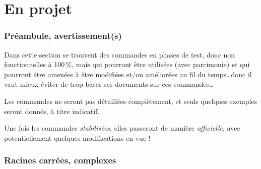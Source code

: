 \part{En projet}

\section{Préambule, avertissement(s)}\label{projets}

\begin{tipblock}
Dans cette section se trouvent des commandes en phases de test, donc non fonctionnelles à 100\,\%, mais qui pourront être utilisées (avec parcimonie) et qui pourront être amenées à être modifiées et/ou améliorées au fil du temps\ldots donc il vaut mieux éviter de trop baser ses documents sur ces commandes\ldots
\end{tipblock}

\begin{cautionblock}
Les commandes ne seront pas détaillées complètement, et seuls quelques exemples seront donnés, à titre indicatif.

\smallskip

Une fois les commandes \textit{stabilisées}, elles passeront de manière \textit{officielle}, avec potentiellement quelques modifications en vue !
\end{cautionblock}

\section{Racines carrées, complexes}

\begin{PresCodeLaTeX}{}
\end{PresCodeLaTeX}

\begin{PresCodeLaTeX}{}
\end{PresCodeLaTeX}

\begin{PresCodeLaTeX}{}
\end{PresCodeLaTeX}

\begin{PresCodeLaTeX}{}
\end{PresCodeLaTeX}

\begin{PresCodeLaTeX}{}
\end{PresCodeLaTeX}

